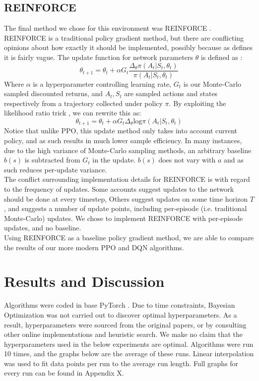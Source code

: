 \documentclass{article}
\begin{document}
\subsection{REINFORCE}
The final method we chose for this environment was REINFORCE \citep{williams1992simple}. REINFORCE is a traditional policy gradient method, but there are conflicting opinions about how exactly it should be implemented, possibly because as \citet{williams1992simple} defines it is fairly vague. The update function for network parameters $\theta$ is defined as \citep{10.5555/3312046}:
\begin{equation}
\theta_{t+1} = \theta_{t} + \alpha G_t\frac{\Delta_\theta\pi(A_t| S_t, \theta_t)}{\pi(A_t| S_t, \theta_t)}
\end{equation}
Where $\alpha$ is a hyperparameter controlling learning rate, $G_t$ is our Monte-Carlo sampled discounted returns, and $A_t,S_t$ are sampled actions and states respectively from a trajectory collected under policy $\pi$. By exploiting the likelihood ratio trick \citep{silver2015}, we can rewrite this as:
\begin{equation}
  \theta_{t+1} = \theta_{t} + \alpha G_t\Delta_\theta \text{log} \pi(A_t | S_t, \theta_t)
\end{equation}
Notice that unlike PPO, this update method only takes into account current policy, and as such results in much lower sample efficiency. In many instances, due to the high variance of Monte-Carlo sampling methods, an arbitrary baseline $b(s)$ is subtracted from $G_t$ in the update. $b(s)$ does not vary with $a$ and as such reduces per-update variance. \\\newline
The conflict surrounding implementation details for REINFORCE is with regard to the frequency of updates. Some accounts \citep{10.5555/3312046} suggest updates to the network should be done at every timestep, Others \citep{silver2015} suggest updates on some time horizon $T$, and \citet{williams1992simple} suggests a number of update points, including per-episode (i.e. traditional Monte-Carlo) updates. We chose to implement REINFORCE with per-episode updates, and no baseline. \\\newline
Using REINFORCE as a baseline policy gradient method, we are able to compare the results of our more modern PPO and DQN algorithms.
\section{Results and Discussion}
Algorithms were coded in base PyTorch \citep{NEURIPS2019_9015}. Due to time constraints, Bayesian Optimization was not carried out to discover optimal hyperparameters. As a result, hyperparameters were sourced from the original papers, or by consulting other online implementations and heuristic search. We make no claim that the hyperparameters used in the below experiments are optimal. Algorithms were run 10 times, and the graphs below are the average of these runs. Linear interpolation was used to fit data points per run to the average run length. Full graphs for every run can be found in Appendix X. 
\end{document}
